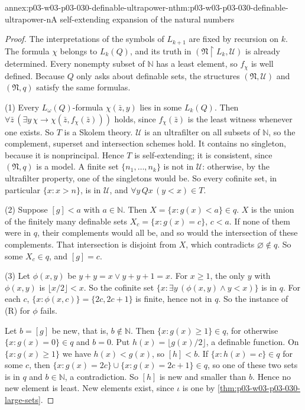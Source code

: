 \begin{annexitem}{annex:p03-w03-p03-030-definable-ultrapower-n}{thm:p03-w03-p03-030-definable-ultrapower-n}{A self-extending expansion of the natural numbers}
\begin{proof}
The interpretations of the symbols of \(L_{k+1}\) are fixed by recursion on
\(k\).  The formula \(\chi\) belongs to \(L_k(Q)\), and its truth in
\((\mathfrak N\restriction L_k,\mathcal U)\) is already determined.  Every
nonempty subset of \(\mathbb N\) has a least element, so \(f_\chi\) is well
defined.  Because \(Q\) only asks about definable sets, the structures
\((\mathfrak N,\mathcal U)\) and \((\mathfrak N,q)\) satisfy the same
formulas.

(1) Every \(L_\omega(Q)\)-formula \(\chi(\bar z,y)\) lies in some
\(L_k(Q)\).  Then \(\forall\bar z\,(\exists y\,\chi\rightarrow\chi(\bar
z,f_\chi(\bar z)))\) holds, since \(f_\chi(\bar z)\) is the least witness
whenever one exists.  So \(T\) is a Skolem theory.  \(\mathcal U\) is an
ultrafilter on all subsets of \(\mathbb N\), so the complement, superset and
intersection schemes hold.  It contains no singleton, because it is
nonprincipal.  Hence \(T\) is self-extending; it is consistent, since
\((\mathfrak N,q)\) is a model.  A finite set \(\{n_1,\ldots,n_k\}\) is not in
\(\mathcal U\): otherwise, by the ultrafilter property, one of the
singletons would be.  So every cofinite set, in particular
\(\{x:x>n\}\), is in \(\mathcal U\), and \(\forall y\,Qx\,(y<x)\in T\).

(2) Suppose \([g]<a\) with \(a\in\mathbb N\).  Then \(X=\{x:g(x)<a\}\in q\).
\(X\) is the union of the finitely many definable sets
\(X_c=\{x:g(x)=c\}\), \(c<a\).  If none of them were in \(q\), their
complements would all be, and so would the intersection of these
complements.  That intersection is disjoint from \(X\), which contradicts
\(\varnothing\notin q\).  So some \(X_c\in q\), and \([g]=c\).

(3) Let \(\phi(x,y)\) be \(y+y=x\vee y+y+1=x\).  For \(x\ge1\), the only
\(y\) with \(\phi(x,y)\) is \(\lfloor x/2\rfloor<x\).  So the cofinite set
\(\{x:\exists y\,(\phi(x,y)\wedge y<x)\}\) is in \(q\).  For each \(c\),
\(\{x:\phi(x,c)\}=\{2c,2c+1\}\) is finite, hence not in \(q\).  So the instance
of (R) for \(\phi\) fails.

Let \(b=[g]\) be new, that is, \(b\notin\mathbb N\).  Then
\(\{x:g(x)\ge1\}\in q\), for otherwise \(\{x:g(x)=0\}\in q\) and \(b=0\).
Put \(h(x)=\lfloor g(x)/2\rfloor\), a definable function.  On
\(\{x:g(x)\ge1\}\) we have \(h(x)<g(x)\), so \([h]<b\).  If \(\{x:h(x)=c\}\in
q\) for some \(c\), then \(\{x:g(x)=2c\}\cup\{x:g(x)=2c+1\}\in q\), so one of
these two sets is in \(q\) and \(b\in\mathbb N\), a contradiction.  So \([h]\)
is new and smaller than \(b\).  Hence no new element is least.  New elements
exist, since \(\iota\) is one by \cref{thm:p03-w03-p03-030-large-sets}.
\end{proof}
\end{annexitem}


